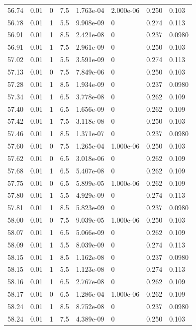 \documentclass[preview]{standalone}
\begin{document}
{{{{{{{{{{{{{{{{{{{\begin{tabular}{L{1.2cm}C{1.2cm} C{0.3cm}C{0.5cm} C{1.4cm}C{1.4cm} C{1.4cm}C{1.4cm}}
  56.74  &  0.01  & 0     & 7.5 &  1.763e-04  & 2.000e-06  & 0.250 &  0.103   \\ 
  56.78  &  0.01  & 1     & 5.5 &  9.908e-09  & 0  & 0.274 &  0.113   \\ 
  56.91  &  0.01  & 1     & 8.5 &  2.421e-08  & 0  & 0.237 &  0.0980   \\ 
  56.91  &  0.01  & 1     & 7.5 &  2.961e-09  & 0  & 0.250 &  0.103   \\ 
  57.02  &  0.01  & 1     & 5.5 &  3.591e-09  & 0  & 0.274 &  0.113   \\ 
  57.13  &  0.01  & 0     & 7.5 &  7.849e-06  & 0  & 0.250 &  0.103   \\ 
  57.28  &  0.01  & 1     & 8.5 &  1.934e-09  & 0  & 0.237 &  0.0980   \\ 
  57.34  &  0.01  & 1     & 6.5 &  3.778e-08  & 0  & 0.262 &  0.109   \\ 
  57.40  &  0.01  & 1     & 6.5 &  1.656e-09  & 0  & 0.262 &  0.109   \\ 
  57.42  &  0.01  & 1     & 7.5 &  3.118e-08  & 0  & 0.250 &  0.103   \\ 
  57.46  &  0.01  & 1     & 8.5 &  1.371e-07  & 0  & 0.237 &  0.0980   \\ 
  57.60  &  0.01  & 0     & 7.5 &  1.265e-04  & 1.000e-06  & 0.250 &  0.103   \\ 
  57.62  &  0.01  & 0     & 6.5 &  3.018e-06  & 0  & 0.262 &  0.109   \\ 
  57.68  &  0.01  & 1     & 6.5 &  5.407e-08  & 0  & 0.262 &  0.109   \\ 
  57.75  &  0.01  & 0     & 6.5 &  5.899e-05  & 1.000e-06  & 0.262 &  0.109   \\ 
  57.80  &  0.01  & 1     & 5.5 &  4.929e-09  & 0  & 0.274 &  0.113   \\ 
  57.81  &  0.01  & 1     & 8.5 &  5.823e-09  & 0  & 0.237 &  0.0980   \\ 
  58.00  &  0.01  & 0     & 7.5 &  9.039e-05  & 1.000e-06  & 0.250 &  0.103   \\ 
  58.07  &  0.01  & 1     & 6.5 &  5.066e-09  & 0  & 0.262 &  0.109   \\ 
  58.09  &  0.01  & 1     & 5.5 &  8.039e-09  & 0  & 0.274 &  0.113   \\ 
  58.15  &  0.01  & 1     & 8.5 &  1.162e-08  & 0  & 0.237 &  0.0980   \\ 
  58.15  &  0.01  & 1     & 5.5 &  1.123e-08  & 0  & 0.274 &  0.113   \\ 
  58.16  &  0.01  & 1     & 6.5 &  2.767e-08  & 0  & 0.262 &  0.109   \\ 
  58.17  &  0.01  & 0     & 6.5 &  1.286e-04  & 1.000e-06  & 0.262 &  0.109   \\ 
  58.24  &  0.01  & 1     & 8.5 &  8.752e-08  & 0  & 0.237 &  0.0980   \\ 
  58.24  &  0.01  & 1     & 7.5 &  4.389e-09  & 0  & 0.250 &  0.103   \\ 
\hline 
\end{tabular} 

}}}}}}}}}}}}}}}}}}}
\end{document}
